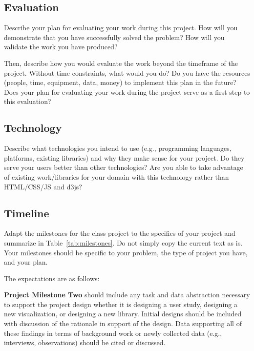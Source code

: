 \subsection{Evaluation}
\label{sec:eval}

Describe your plan for evaluating your work during this project. How will you
demonstrate that you have successfully solved the problem? How will you
validate the work you have produced?

Then, describe how you would evaluate the work beyond the timeframe of the
project. Without time constraints, what would you do? Do you have the
resources (people, time, equipment, data, money) to implement this plan in
the future? Does your plan for evaluating your work during the project serve
as a first step to this evaluation?

\subsection{Technology}
\label{sec:tech}

Describe what technologies you intend to use (e.g., programming languages,
platforms, existing libraries) and why they make sense for your project. Do
they serve your users better than other technologies? Are you able to take
advantage of existing work/libraries for your domain with this technology
rather than HTML/CSS/JS and d3js?  

\subsection{Timeline}
\label{sec:timeline}

Adapt the milestones for the class project to the specifics of your project
and summarize in Table~\ref{tab:milestones}. Do not simply copy the current
text as is. Your milestones should be specific to your problem, the type of
project you have, and your plan.

The expectations are as follows:

\vspace{1.5ex}\noindent\textbf{Project Milestone Two} should include any task
and data abstraction necessary to support the project design whether it is
designing a user study, designing a new visualization, or designing a new
library. Initial designs should be included with discussion of the rationale
in support of the design. Data supporting all of these findings in terms of
background work or newly collected data (e.g., interviews, observations)
should be cited or discussed.

